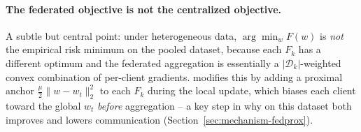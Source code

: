 \paragraph{The federated objective is not the centralized objective.}
A subtle but central point: under heterogeneous data, $\arg\min_w F(w)$ is
\emph{not} the empirical risk minimum on the pooled dataset, because each
$F_k$ has a different optimum and the federated aggregation is essentially a
$|\mathcal{D}_k|$-weighted convex combination of per-client gradients. \fedprox{}
modifies this by adding a proximal anchor $\frac{\mu}{2} \|w - w_t\|_2^2$ to
each $F_k$ during the local update, which biases each client toward the global
$w_t$ \emph{before} aggregation -- a key step in why \fedprox{} on this dataset
both improves \auprc{} and lowers communication
(Section~\ref{sec:mechanism-fedprox}).
